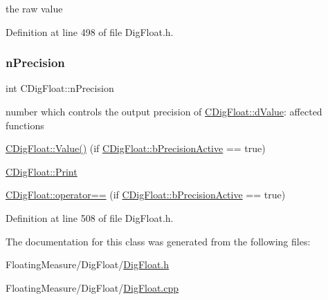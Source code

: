 the raw value 



Definition at line 498 of file Dig\+Float.\+h.

\mbox{\label{classCDigFloat_ad580654be35246d14c91482581c0bc11}} 
\subsubsection{\texorpdfstring{n\+Precision}{nPrecision}}
{\footnotesize\ttfamily int C\+Dig\+Float\+::n\+Precision\hspace{0.3cm}{\ttfamily [protected]}}



number which controls the output precision of \hyperlink{classCDigFloat_a4bbe69e30dd4e20527362493aa9aaf96}{C\+Dig\+Float\+::d\+Value}\+: affected functions 


\begin{DoxyItemize}
\item \hyperlink{classCDigFloat_af74b8cd0935294b6371f551b7a1ff640}{C\+Dig\+Float\+::\+Value()} (if \hyperlink{classCDigFloat_aa1f6ed0312a2aa6ae5ee2abd195adefc}{C\+Dig\+Float\+::b\+Precision\+Active} == true)
\item \hyperlink{classCDigFloat_a80731e0970f607114d6d1bde4d02bd39}{C\+Dig\+Float\+::\+Print}
\item \hyperlink{classCDigFloat_ad8980d984bf2bab71d15b830fd0180a5}{C\+Dig\+Float\+::operator==} (if \hyperlink{classCDigFloat_aa1f6ed0312a2aa6ae5ee2abd195adefc}{C\+Dig\+Float\+::b\+Precision\+Active} == true) 
\end{DoxyItemize}

Definition at line 508 of file Dig\+Float.\+h.



The documentation for this class was generated from the following files\+:\begin{DoxyCompactItemize}
\item 
Floating\+Measure/\+Dig\+Float/\hyperlink{DigFloat_8h}{Dig\+Float.\+h}\item 
Floating\+Measure/\+Dig\+Float/\hyperlink{DigFloat_8cpp}{Dig\+Float.\+cpp}\end{DoxyCompactItemize}
